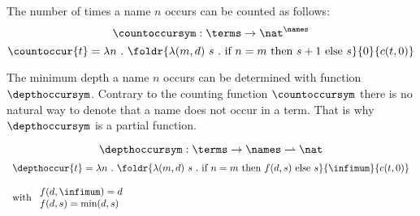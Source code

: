 \begin{definition}[$\countoccur{x}$]
  The number of times a name $n$ occurs can be counted as follows:
  \[ \countoccursym : \terms \rightarrow \nat^{\names} \]
  \[ \countoccur{t} = \lambda n ~.~ \foldr{\lambda (m, d)~s ~.~ \text{if~} n = m \text{~then~} s+1 \text{~else~} s}{0}{c(t, 0)} \]
\end{definition}

\begin{definition}[$\depthoccur{x}$]
  The minimum depth a name $n$ occurs can be determined with function $\depthoccursym$.
  Contrary to the counting function $\countoccursym$ there is no natural way to denote that a name does
  not occur in a term.
  That is why $\depthoccursym$ is a partial function.
  
  \[ \depthoccursym : \terms \rightarrow \names \rightharpoonup \nat \]
  \[
    \begin{array}{l}
      \depthoccur{t} = \lambda n ~.~ \foldr{\lambda (m, d)~s ~.~ \text{if~} n = m \text{~then~} f(d, s) \text{~else~} s}{\infimum}{c(t, 0)} \\
      \\
      \text{with~} \begin{array}{l}
        f(d, \infimum) = d \\
        f(d, s) = \text{min}(d, s) \\
      \end{array}
    \end{array}
  \]
\end{definition}
